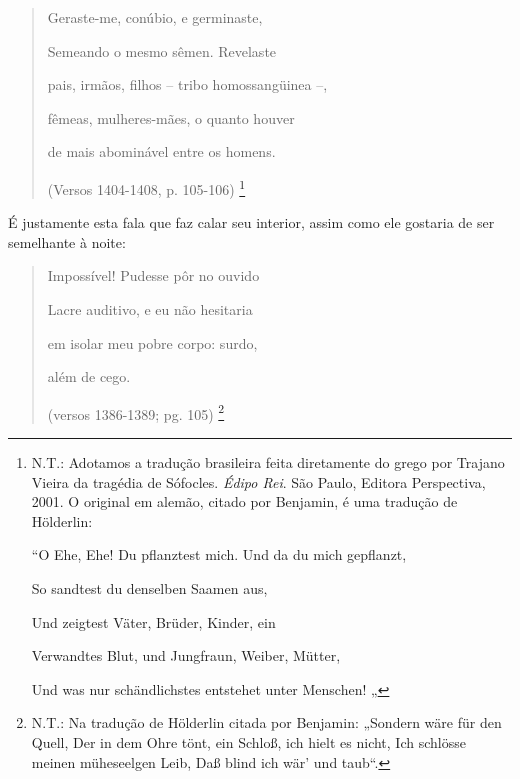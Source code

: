 \begin{quote}
Geraste-me, conúbio, e germinaste,

Semeando o mesmo sêmen. Revelaste

pais, irmãos, filhos -- tribo homossangüinea --,

fêmeas, mulheres-mães, o quanto houver

de mais abominável entre os homens.

(Versos 1404-1408, p. 105-106) \footnote{N.T.: Adotamos a tradução
  brasileira feita diretamente do grego por Trajano Vieira da tragédia
  de Sófocles. \emph{Édipo Rei}. São Paulo, Editora Perspectiva, 2001. O
  original em alemão, citado por Benjamin, é uma tradução de Hölderlin:

  ``O Ehe, Ehe! Du pflanztest mich. Und da du mich gepflanzt,

  So sandtest du denselben Saamen aus,

  Und zeigtest Väter, Brüder, Kinder, ein

  Verwandtes Blut, und Jungfraun, Weiber, Mütter,

  Und was nur schändlichstes entstehet unter Menschen! „}
\end{quote}

É justamente esta fala que faz calar seu interior, assim como ele
gostaria de ser semelhante à noite:

\begin{quote}
Impossível! Pudesse pôr no ouvido

Lacre auditivo, e eu não hesitaria

em isolar meu pobre corpo: surdo,

além de cego.

(versos 1386-1389; pg. 105) \footnote{N.T.: Na tradução de Hölderlin
  citada por Benjamin: „Sondern wäre für den Quell, Der in dem Ohre
  tönt, ein Schloß, ich hielt es nicht, Ich schlösse meinen müheseelgen
  Leib, Daß blind ich wär' und taub``.}
\end{quote}

